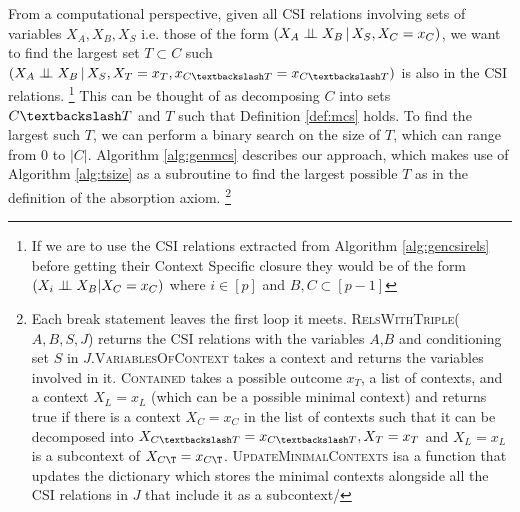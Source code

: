 \documentclass{tufte-book}
\begin{document}
From a computational perspective, given all CSI relations involving sets of variables \(X_A,X_B,X_S\) i.e. those of the form \((X_A \perp \!\!\! \perp X_B \,|\, X_S, X_C=x_C)\), we want to find the largest set \(T \subset C\) such \((X_A \indep X_B \,|\, X_S, X_T=x_T, x_{C \textbackslash T} = x_{C \textbackslash T})\) is also in the CSI relations.  \footnote{If we are to use the CSI relations extracted from Algorithm \ref{alg:gencsirels} before getting their Context Specific closure they would be of the form $(X_i \perp \!\!\! \perp X_B | X_C=x_C)$ where $i \in [p]$ and $B ,C \subset [p-1]$}  This can be thought of as decomposing \(C\) into sets \(C \textbackslash T\) and \(T\) such that Definition \ref{def:mcs} holds. To find the largest such \(T\), we can perform a binary search on the size of \(T\), which can range from \(0\) to \(|C|\). Algorithm \ref{alg:genmcs} describes our approach, which makes use of Algorithm \ref{alg:tsize} as a subroutine to find the largest possible \(T\) as in the definition of the absorption axiom.  \footnote{Each break statement leaves the first loop it meets. \textsc{RelsWithTriple}($A,B,S,J$) returns the CSI relations with the variables $A$,$B$ and conditioning set $S$ in $J$.\textsc{VariablesOfContext} takes a context and returns the variables involved in it. \textsc{Contained} takes a possible outcome $x_T$, a list of contexts, and a context $X_L=x_L$ (which can be a possible minimal context) and returns true if there is a context $X_C=x_C$ in the list of contexts such that it can be decomposed into $X_{C\textbackslash T}=x_{C\textbackslash T}, X_T=x_T$ and $X_L=x_L$ is a subcontext of $X_{C\T}=x_{C\T}$. \textsc{UpdateMinimalContexts} isa a function that updates the dictionary which stores the minimal contexts alongside all the CSI relations in $J$ that include it as a subcontext/} 
\end{document}
